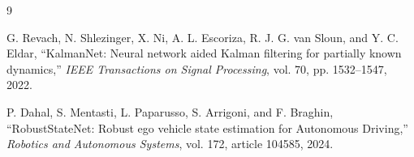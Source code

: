 \documentclass[11pt,a4paper]{article}
\begin{document}
\begin{thebibliography}{9}

G. Revach, N. Shlezinger, X. Ni, A. L. Escoriza, R. J. G. van Sloun, and
Y. C. Eldar, ``KalmanNet: Neural network aided Kalman filtering for partially
known dynamics,'' \emph{IEEE Transactions on Signal Processing}, vol. 70,
pp. 1532--1547, 2022.

P. Dahal, S. Mentasti, L. Paparusso, S. Arrigoni, and F. Braghin,
``RobustStateNet: Robust ego vehicle state estimation for Autonomous Driving,''
\emph{Robotics and Autonomous Systems}, vol. 172, article 104585, 2024.

\end{thebibliography}
\end{document}
